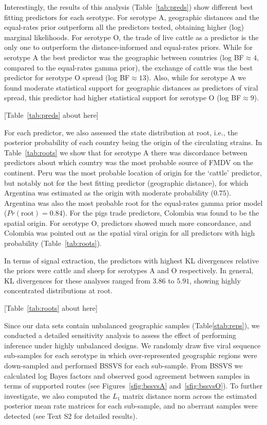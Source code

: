 \documentclass[10pt]{article}
\begin{document}
Interestingly, the results of this analysis (Table~\ref{tab:preds}) show different best fitting predictors for each serotype.
For serotype A, geographic distances and the equal-rates prior outperform all the predictors tested, obtaining higher (log) marginal likelihoods.
For serotype O, the trade of live cattle as a predictor is the only one to outperform the distance-informed and equal-rates  priors.
While for serotype A the best predictor was the geographic between countries (log BF$\approx 4$, compared to the equal-rates gamma prior), the exchange of cattle was the best predictor for serotype O spread (log BF$\approx 13$).
Also, while for serotype A we found moderate statistical support for geographic distances as predictors of viral spread, this predictor had higher statistical support for serotype O (log BF$\approx 9$).

\begin{center}
 [Table~\ref{tab:preds} about here]
\end{center}

For each predictor, we also assessed the state distribution at root, i.e., the posterior probability of each country being the origin of the circulating strains.
In Table~\ref{tab:roots} we show that for serotype A there was discordance between predictors about which country was the most probable source of FMDV on the continent.
Peru was the most probable location of origin for the `cattle' predictor, but notably not for the best fitting predictor (geographic distance), for which Argentina was estimated as the origin with moderate probability ($0.75$).
Argentina was also the most probable root for the equal-rates gamma prior model ($Pr(\text{root})=0.84$).
For the pigs trade predictors, Colombia was found to be the spatial origin.
For serotype O, predictors showed much more concordance, and Colombia was pointed out as the spatial viral origin for all predictors with high probability (Table~\ref{tab:roots}).

In terms of signal extraction, the predictors with highest KL divergences relative the priors were cattle and sheep for serotypes A and O respectively.
In general, KL divergences for these analyses ranged from $3.86$ to $5.91$, showing highly concentrated distributions at root. 

\begin{center}
 [Table~\ref{tab:roots} about here]
\end{center}

Since our data sets contain unbalanced geographic samples (Table\ref{stab:reps}), we conducted a detailed sensitivity analysis to assess the effect of performing inference under highly unbalanced designs.
We randomly draw five viral sequence sub-samples for each serotype in which over-represented geographic regions were down-sampled and performed BSSVS for each sub-sample.
From BSSVS we calculated log Bayes factors and observed good agreement between samples in terms of supported routes (see Figures~\ref{sfig:bssvsA} and~\ref{sfig:bssvsO}).
To further investigate, we also computed the $L_1$ matrix distance norm across the estimated posterior mean rate matrices for each sub-sample, and no aberrant samples were detected (see Text S2 for detailed results).
\end{document}
